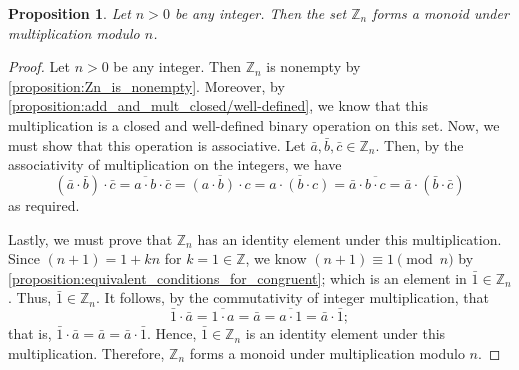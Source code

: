 \documentclass[10pt, titlepage]{amsart}
\newcommand\Z{{\mathbb Z}}
\newtheorem{prop}{Proposition}[subsection]
\theoremstyle{definition}
\begin{document}
	\begin{prop}\label{proposition:Zn_is_a_monoid_under_multiplication}
		Let $n>0$ be any integer. Then the set $\Z_n$ forms a monoid under multiplication modulo $n$.
	\end{prop}
	
	\begin{proof}
		Let $n>0$ be any integer.
		Then $\Z_n$ is nonempty by \cref{proposition:Zn_is_nonempty}.
		Moreover, by \cref{proposition:add_and_mult_closed/well-defined}, we know that this multiplication is a closed and well-defined binary operation on this set. 
		Now, we must show that this operation is associative.
		Let $\bar{a}, \bar{b}, \bar{c} \in \Z_n$.
		Then, by the associativity of multiplication on the integers, we have $$(\bar{a} \cdot \bar{b}) \cdot \bar{c} = \overline{a \cdot b}  \cdot \bar{c} = \overline{(a \cdot b) \cdot c} = \overline{a \cdot (b \cdot c)} = \bar{a} \cdot \overline{b \cdot c} = \bar{a} \cdot (\bar{b} \cdot \bar{c})$$ as required.
		
		Lastly, we must prove that $\Z_n$ has an identity element under this multiplication.
		Since $(n+1) = 1 + kn$ for $k=1 \in \Z$, we know $(n+1) \equiv 1 \pmod n$ by \cref{proposition:equivalent_conditions_for_congruent}; which is an element in $\bar{1} \in \Z_n$.
		Thus, $\bar{1} \in \Z_n$.
		It follows, by the commutativity of integer multiplication, that $$\bar{1} \cdot \bar{a} = \overline{1 \cdot a} = \bar{a} = \overline{a \cdot 1} = \bar{a} \cdot \bar{1};$$ that is, $\bar{1} \cdot \bar{a} = \bar{a} = \bar{a} \cdot \bar{1}$.
		Hence, $\bar{1} \in \Z_n$ is an identity element under this multiplication.
		Therefore, $\Z_n$ forms a monoid under multiplication modulo $n$.
	\end{proof}	
	
\end{document}
